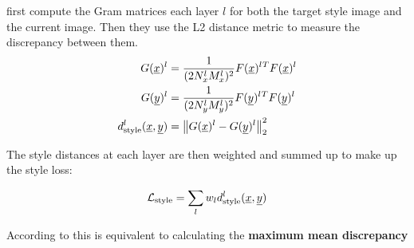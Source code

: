 \citeauthor*{gatys} first compute the Gram matrices each layer $l$ for both the target style image and the current image.
Then they use the L2 distance metric to measure the discrepancy between them.
\begin{align}
    G(\underline x)^l & = \frac{1}{(2 N_x^l M_x^l)^2} F(\underline x)^l{}^T F(\underline x)^l \\
    G(\underline y)^l & = \frac{1}{(2 N_y^l M_y^l)^2} F(\underline y)^l{}^T F(\underline y)^l \\
    d_{\text{style}}^l(\underline x, \underline y) & = \left\lVert G(\underline x)^l - G(\underline y)^l\right\rVert^2_2 \\
\end{align}


The style distances at each layer are then weighted and summed up to make up the style loss:

\begin{align}
    \mathcal{L}_{\text{style}} = \sum_{l} w_l d_{\text{style}}^l(\underline x, \underline y)
\end{align}










According to \citeauthor*{MMD} this is equivalent to calculating the \textbf{maximum mean discrepancy}





